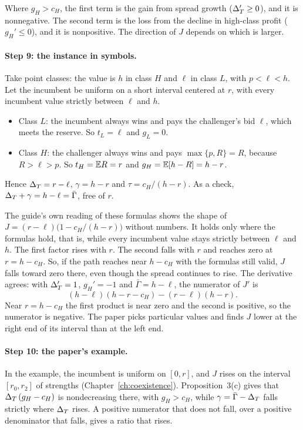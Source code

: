Where \(g_H>c_H\), the first term is the gain from spread growth (\(\Delta_T'\ge0\)), and it is nonnegative. The second
term is the loss from the decline in high-class profit (\(g_H'\le0\)), and it is nonpositive. The direction of
\(J\) depends on which is larger.

\paragraph{Step 9: the instance in symbols.} Take point classes: the value is \(h\) in class \(H\) and \(\ell\) in
class \(L\), with \(p<\ell<h\). Let the incumbent be uniform on a short interval centered at \(r\), with every
incumbent value strictly between \(\ell\) and \(h\).
\begin{itemize}
\item Class \(L\): the incumbent always wins and pays the challenger's bid \(\ell\), which meets the reserve. So
\(t_L=\ell\) and \(g_L=0\).
\item Class \(H\): the challenger always wins and pays \(\max\{p,R\}=R\), because \(R>\ell>p\). So \(t_H=\mathbb{E} R=r\)
and \(g_H=\mathbb{E}[h-R]=h-r\).
\end{itemize}
Hence \(\Delta_T=r-\ell\), \(\gamma=h-r\) and \(\tau=c_H/(h-r)\). As a check, \(\Delta_T+\gamma=h-\ell=\bar\Gamma\), free of
\(r\).

The guide's own reading of these formulas shows the shape of \(J=(r-\ell)\bigl(1-c_H/(h-r)\bigr)\) without numbers.
It holds only where the formulas hold, that is, while every incumbent value stays strictly between \(\ell\) and
\(h\). The first factor rises with \(r\). The second falls with \(r\) and reaches zero at \(r=h-c_H\). So, if the
path reaches near \(h-c_H\) with the formulas still valid, \(J\) falls toward zero there, even though the spread
continues to rise. The derivative agrees: with \(\Delta_T'=1\), \(g_H'=-1\) and \(\bar\Gamma=h-\ell\), the numerator of
\(J'\) is
\[
(h-\ell)(h-r-c_H)-(r-\ell)(h-r).
\]
Near \(r=h-c_H\) the first product is near zero and the second is positive, so the numerator is negative. The paper
picks particular values and finds \(J\) lower at the right end of its interval than at the left end.

\paragraph{Step 10: the paper's example.} In the example, the incumbent is uniform on \([0,r]\), and \(J\) rises on
the interval \([r_0,r_2]\) of strengths (Chapter~\ref{ch:coexistence}). Proposition~3(c) gives that
\(\Delta_T\,(g_H-c_H)\) is nondecreasing there, with \(g_H>c_H\), while \(\gamma=\bar\Gamma-\Delta_T\) falls strictly where
\(\Delta_T\) rises. A positive numerator that does not fall, over a positive denominator that falls, gives a ratio that rises.

